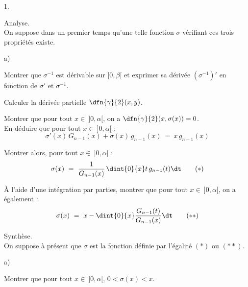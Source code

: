 \documentclass[11pt]{article}%
\begin{document}
\begin{noliste}{1.}
  \setlength{\itemsep}{4mm}
  \setcounter{enumi}{5}
  \item Analyse.\\
  On suppose dans un premier temps qu'une telle fonction $\sigma$ 
  vérifiant ces trois propriétés existe.
  \begin{noliste}{a)}
    \setlength{\itemsep}{2mm}
    \item Montrer que $\sigma^{-1}$ est dérivable sur $]0,\beta[$ et 
    exprimer sa dérivée $(\sigma^{-1})'$ en fonction de $\sigma'$
    et $\sigma^{-1}$.
    
    
    
    

    
    \item Calculer la dérivée partielle $\dfn{\gamma}{2}(x, y)$.
    
    

    \item Montrer que pour tout $x \in \ ]0, \alpha[$, on a 
    $\dfn{\gamma}{2}(x, \sigma(x))=0$.\\
    En déduire que pour tout $x \in \ ]0, \alpha[$ : 
    \[
      \sigma'(x) \, G_{n-1}(x) + \sigma(x) \, g_{n-1}(x) \ = \
      x \, g_{n-1}(x)
    \]
    
    

    
    \item Montrer alors, pour tout $x \in \ ]0,\alpha[$ : 
    \[
      \sigma(x) \ = \ \dfrac{1}{G_{n-1}(x)} \, \dint{0}{x} t \, 
      g_{n-1}(t) \dt \qquad (*)
    \]
    
    
    
    \item À l'aide d'une intégration par parties, montrer que pour tout
    $x \in \ ]0,\alpha[$, on a également : 
    \[
      \sigma(x) \ = \ x - \dint{0}{x} \dfrac{G_{n-1}(t)}{G_{n-1}(x)}
      \dt \qquad (**)
    \]
    
    
  \end{noliste}
  
  \item Synthèse.\\
  On suppose à présent que $\sigma$ est la fonction définie par 
  l'égalité $(*)$ ou $(**)$.
  \begin{noliste}{a)}
    \setlength{\itemsep}{2mm}
    \item Montrer que pour tout $x \in \ ]0, \alpha[$, $0 < \sigma(x)
    <x$.
    
    


\end{noliste}
\end{noliste}
\end{document}
